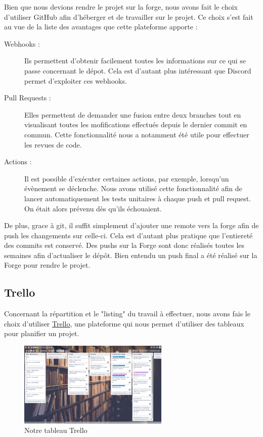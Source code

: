 			Bien que nous devions rendre le projet sur la forge, nous avons fait le choix d'utiliser GitHub afin d'héberger et de travailler sur le projet. Ce choix s'est fait au vue de la liste des avantages que cette plateforme apporte :

			\begin{description}
				\item[Webhooks :]{Ils permettent d'obtenir facilement toutes les informations sur ce qui se passe concernant le dépot. Cela est d'autant plus intéressant que Discord permet d'exploiter ces webhooks.}
				\item[Pull Requests :]{Elles permettent de demander une fusion entre deux branches tout en visualisant toutes les mofifications effectués depuis le dernier commit en commun. Cette fonctionnalité nous a notamment été utile pour effectuer les revues de code.}
				\item[Actions :]{Il est possible d'exécuter certaines actions, par exemple, lorsqu'un évènement se déclenche. Nous avons utilisé cette fonctionnalité afin de lancer automatiquement les tests unitaires à chaque push et pull request. On était alors prévenu dès qu'ils échouaient.}
			\end{description}

			De plus, grace à git, il suffit simplement d'ajouter une remote vers la forge afin de push les changements sur celle-ci. Cela est d'autant plus pratique que l'entiereté des commits est conservé. Des pushs sur la Forge sont donc réalisés toutes les semaines afin d'actualiser le dépôt. Bien entendu un push final a été réalisé sur la Forge pour rendre le projet.

		\subsection{Trello}

			Concernant la répartition et le "listing" du travail à effectuer, nous avons fais le choix d'utiliser \href{https://trello.com}{Trello}, une plateforme qui nous permet d'utiliser des tableaux pour planifier un projet.

			\begin{figure}[H]
				\centering\includegraphics[width=0.64\textwidth, keepaspectratio]{img/trello.png}
				\caption{Notre tableau Trello}
				\label{fig:trello}
			\end{figure}

